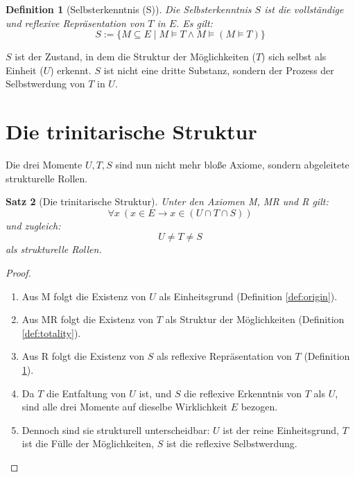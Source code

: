 \documentclass[12pt,a4paper]{article}
\newtheorem{theorem}{Satz}[section]
\newtheorem{definition}[theorem]{Definition}
\begin{document}
\begin{definition}[Selbsterkenntnis (S)]
\label{def:selfknowledge}
Die Selbsterkenntnis \(S\) ist die vollständige und reflexive Repräsentation von \(T\) in \(E\). Es gilt:
\begin{equation}
S := \{M \subseteq E \mid M \models T \land M \models (M \models T)\}
\end{equation}
\end{definition}

\(S\) ist der Zustand, in dem die Struktur der Möglichkeiten (\(T\)) sich selbst als Einheit (\(U\)) erkennt. \(S\) ist nicht eine dritte Substanz, sondern der Prozess der Selbstwerdung von \(T\) in \(U\).

\section{Die trinitarische Struktur}

Die drei Momente \(U, T, S\) sind nun nicht mehr bloße Axiome, sondern abgeleitete strukturelle Rollen.

\begin{theorem}[Die trinitarische Struktur]
\label{thm:trinity}
Unter den Axiomen M, MR und R gilt:
\begin{equation}
\forall x \ (x \in E \rightarrow x \in (U \cap T \cap S))
\end{equation}
und zugleich:
\begin{equation}
U \neq T \neq S
\end{equation}
als strukturelle Rollen.
\end{theorem}

\begin{proof}
\begin{enumerate}
\item Aus M folgt die Existenz von \(U\) als Einheitsgrund (Definition \ref{def:origin}).
\item Aus MR folgt die Existenz von \(T\) als Struktur der Möglichkeiten (Definition \ref{def:totality}).
\item Aus R folgt die Existenz von \(S\) als reflexive Repräsentation von \(T\) (Definition \ref{def:selfknowledge}).
\item Da \(T\) die Entfaltung von \(U\) ist, und \(S\) die reflexive Erkenntnis von \(T\) als \(U\), sind alle drei Momente auf dieselbe Wirklichkeit \(E\) bezogen.
\item Dennoch sind sie strukturell unterscheidbar: \(U\) ist der reine Einheitsgrund, \(T\) ist die Fülle der Möglichkeiten, \(S\) ist die reflexive Selbstwerdung.
\end{enumerate}
\end{proof}
\end{document}
